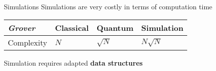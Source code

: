 \begin{frame}{Simulations}
  Simulations are very costly in terms of computation time
  \begin{table}[]
    \begin{tabular}{l|l|l|l}
        \textit{Grover} & Classical & Quantum & Simulation    \\ \hline \rule{0pt}{2.6ex}
    Complexity & $N$       & $\sqrt N$ & {\color{cs}$N \sqrt N$}
    \end{tabular}
  \end{table}

  \vspace{1em}

  Simulation requires adapted \textbf{data structures}
\end{frame}